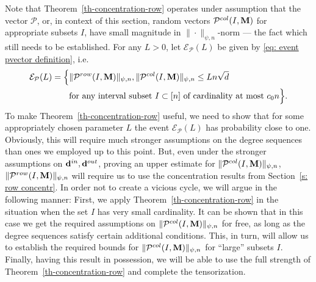 \documentclass[12pt]{article}
\theoremstyle{definition}
\theoremstyle{plain}
\newcommand{\Event}{\mathcal{E}}
\def\ranmtx{{\bf{}M}}
\def\InDeg{{\bf d}^{in}}
\def\OutDeg{{\bf d}^{out}}
\def\pvector{{\mathcal P}}
\begin{document}
Note that Theorem~\ref{th-concentration-row} operates under assumption that the vector $\pvector$,
or, in context of this section, random vectors $\pvector^{col}(I,\ranmtx)$ for appropriate subsets $I$, have small magnitude
in $\|\cdot\|_{\psi,n}$-norm --- the fact which still needs to be established.
For any $L>0$, let $\Event_\pvector(L)$ be given by \eqref{eq: event pvector definition}, i.e.\
\begin{equation*}
\begin{split}
\Event_\pvector(L)=\Big\{
&\|\pvector^{row}(I,\ranmtx)\|_{\psi,n},\|\pvector^{col}(I,\ranmtx)\|_{\psi,n}\leq  L  n\sqrt{d}\\
&\mbox{for any interval subset $I\subset[n]$ of cardinality at most $c_0 n$}\Big\}.\end{split}
\end{equation*}
To make Theorem~\ref{th-concentration-row} useful, we need to show that for some appropriately chosen
parameter $L$ the event $\Event_\pvector(L)$ has probability close to one.
Obviously, this will require much stronger assumptions on the degree sequences
than ones we employed up to this point. But, even under the stronger assumptions on $\InDeg,\OutDeg$,
proving an upper estimate for $\|\pvector^{col}(I,\ranmtx)\|_{\psi,n}$,
$\|\pvector^{row}(I,\ranmtx)\|_{\psi,n}$ will require us to use the concentration results
from Section~\ref{s: row concentr}. In order not to create a vicious cycle, we will argue in the following manner:
First, we apply Theorem~\ref{th-concentration-row} in the situation when the set $I$ has very small cardinality.
It can be shown that in this case we get the required assumptions on $\|\pvector^{col}(I,\ranmtx)\|_{\psi,n}$
for free, as long as the degree sequences satisfy certain additional conditions. This, in turn,
will allow us to establish the required bounds for $\|\pvector^{col}(I,\ranmtx)\|_{\psi,n}$
for ``large'' subsets $I$. Finally, having this result in possession, we will be able to use the full strength of Theorem~\ref{th-concentration-row}
and complete the tensorization.
\end{document}
